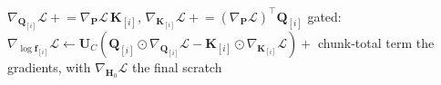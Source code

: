 \begin{algorithmic}
\STATE $\nabla_{\mathbf{Q}_{[i]}}\mathcal{L} \mathrel{+}= \nabla_{\mathbf{P}}\mathcal{L}\, \mathbf{K}_{[i]}$, $\nabla_{\mathbf{K}_{[i]}}\mathcal{L} \mathrel{+}= \left(\nabla_{\mathbf{P}}\mathcal{L}\right)^\top \mathbf{Q}_{[i]}$ 
\STATE gated: $\nabla_{\log \mathbf{f}_{[i]}}\mathcal{L} \gets \mathbf{U}_C \left( \mathbf{Q}_{[i]} \odot \nabla_{\mathbf{Q}_{[i]}}\mathcal{L} - \mathbf{K}_{[i]} \odot \nabla_{\mathbf{K}_{[i]}}\mathcal{L} \right) + $ chunk-total term 
\ENDFOR
\ENDFOR
\RETURN the gradients, with $\nabla_{\mathbf{H}_0}\mathcal{L}$ the final scratch
\end{algorithmic}
